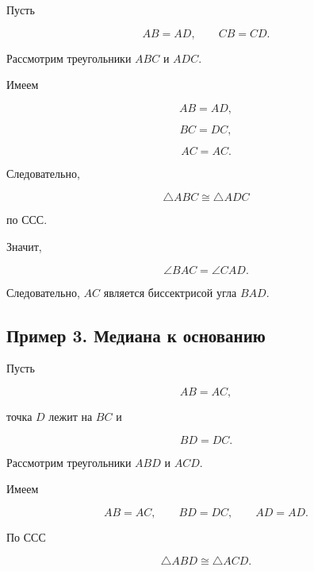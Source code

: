 \documentclass[a4paper,12pt]{article}
\begin{document}
Пусть

\[
AB=AD,
\qquad
CB=CD.
\]

Рассмотрим треугольники $ABC$ и $ADC$.

Имеем

\[
AB=AD,
\]

\[
BC=DC,
\]

\[
AC=AC.
\]

Следовательно,

\[
\triangle ABC\cong\triangle ADC
\]

по ССС.

Значит,

\[
\angle BAC=\angle CAD.
\]

Следовательно, $AC$ является биссектрисой угла $BAD$.

\begin{center}


\end{center}

\subsection*{Пример 3. Медиана к основанию}

Пусть

\[
AB=AC,
\]

точка $D$ лежит на $BC$ и

\[
BD=DC.
\]

Рассмотрим треугольники $ABD$ и $ACD$.

Имеем

\[
AB=AC,
\qquad
BD=DC,
\qquad
AD=AD.
\]

По ССС

\[
\triangle ABD\cong\triangle ACD.
\]
\end{document}
